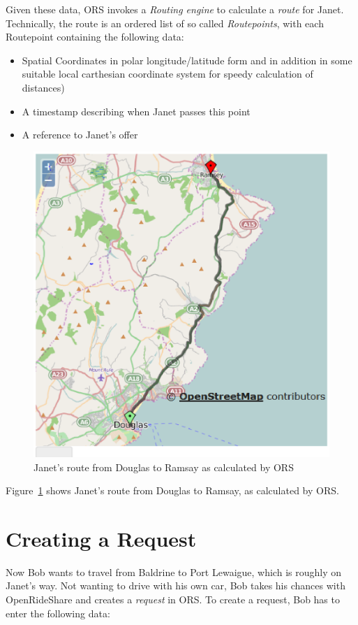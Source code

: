 Given these data, ORS invokes a \emph{Routing engine} to calculate a \emph{route} for
Janet.  Technically, the route is an ordered list of so called  \emph{Routepoints}, 
with each Routepoint containing the following data:
\begin{itemize}
\item{Spatial Coordinates in polar longitude/latitude form
              and in addition in some suitable local carthesian coordinate system 
              for speedy calculation of distances)}
\item{A timestamp describing when Janet passes this point}
\item{A reference to Janet's offer}
\end{itemize}

\begin{figure}[t]
\includegraphics[scale=0.5]{images/maps/01-OSM-DouglasToRamsay.eps}
\caption{Janet's route from Douglas to Ramsay as calculated by ORS}
\label{pic:janetRoute}
\end{figure}


Figure~\ref{pic:janetRoute} shows Janet's route from Douglas to Ramsay, as calculated by ORS.

\section{Creating a Request}
Now Bob wants to travel from Baldrine to Port Lewaigue, which is roughly on Janet's way. 
Not wanting to drive with his own car, Bob takes his chances with OpenRideShare and creates a 
\emph{request} in ORS. 
To create a request, Bob has to enter the following data:

